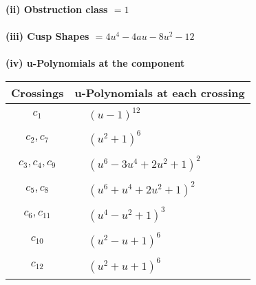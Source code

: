 \documentclass[1p]{elsarticle_modified}
\theoremstyle{definition}
\begin{document}
\flushleft \textbf{(ii) Obstruction class $= 1$}\\~\\
\flushleft \textbf{(iii) Cusp Shapes $= 4 u^4-4 a u-8 u^2-12$}\\~\\
\newpage\renewcommand{\arraystretch}{1}
\flushleft \textbf{(iv) u-Polynomials at the component}\newline \\
\begin{tabular}{m{50pt}|m{274pt}}
Crossings & \hspace{64pt}u-Polynomials at each crossing \\
\hline $$\begin{aligned}c_{1}\end{aligned}$$&$\begin{aligned}
&(u-1)^{12}
\end{aligned}$\\
\hline $$\begin{aligned}c_{2},c_{7}\end{aligned}$$&$\begin{aligned}
&(u^2+1)^6
\end{aligned}$\\
\hline $$\begin{aligned}c_{3},c_{4},c_{9}\end{aligned}$$&$\begin{aligned}
&(u^6-3 u^4+2 u^2+1)^2
\end{aligned}$\\
\hline $$\begin{aligned}c_{5},c_{8}\end{aligned}$$&$\begin{aligned}
&(u^6+u^4+2 u^2+1)^2
\end{aligned}$\\
\hline $$\begin{aligned}c_{6},c_{11}\end{aligned}$$&$\begin{aligned}
&(u^4- u^2+1)^3
\end{aligned}$\\
\hline $$\begin{aligned}c_{10}\end{aligned}$$&$\begin{aligned}
&(u^2- u+1)^6
\end{aligned}$\\
\hline $$\begin{aligned}c_{12}\end{aligned}$$&$\begin{aligned}
&(u^2+u+1)^6
\end{aligned}$\\
\hline
\end{tabular}\\~\\
\end{document}
